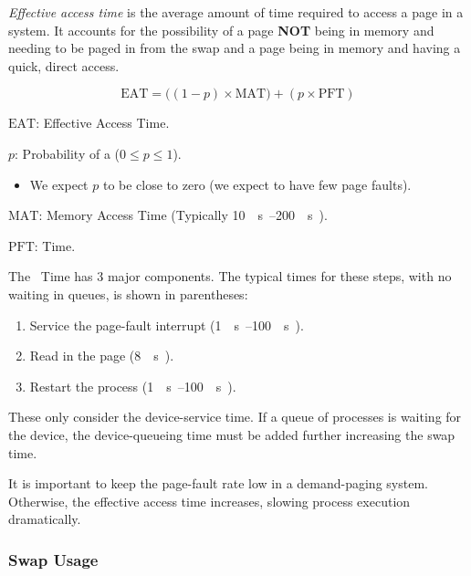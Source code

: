 \begin{definition}\label{def:Effective_Access_Time}
  \emph{Effective access time} is the average amount of time required to access a page in a  system.
  It accounts for the possibility of a page \textbf{NOT} being in memory and needing to be paged in from the swap and a page being in memory and having a quick, direct access.

  \begin{equation}\label{eq:Effective_Access_Time}
    \mathrm{EAT} = \bigl( (1-p) \times \mathrm{MAT} \bigr) + (p \times \mathrm{PFT})
  \end{equation}
  \begin{description}[noitemsep]
  \item $\mathrm{EAT}$: Effective Access Time.
  \item $p$: Probability of a  ($0 \leq p \leq 1$).
    \begin{itemize}[noitemsep]
    \item We expect $p$ to be close to zero (we expect to have few page faults).
    \end{itemize}
  \item $\mathrm{MAT}$: Memory Access Time (Typically \SIrange{10}{200}{\nano{} \second{}}).
  \item $\mathrm{PFT}$:  Time.
  \end{description}
\end{definition}

The ~Time has 3 major components.
The typical times for these steps, with no waiting in queues, is shown in parentheses:
\begin{enumerate}[noitemsep]
\item Service the page-fault interrupt (\SIrange{1}{100}{\micro{} \second{}}).
\item Read in the page (\SI{8}{\milli{} \second{}}).
\item Restart the process (\SIrange{1}{100}{\micro{} \second{}}).
\end{enumerate}

These only consider the device-service time.
If a queue of processes is waiting for the device, the device-queueing time must be added further increasing the swap time.

\begin{blackbox}
  It is important to keep the page-fault rate low in a demand-paging system.
  Otherwise, the effective access time increases, slowing process execution dramatically.
\end{blackbox}

\subsubsection{Swap Usage}\label{subsubsec:Demand_Paging_Swap_Usage}

